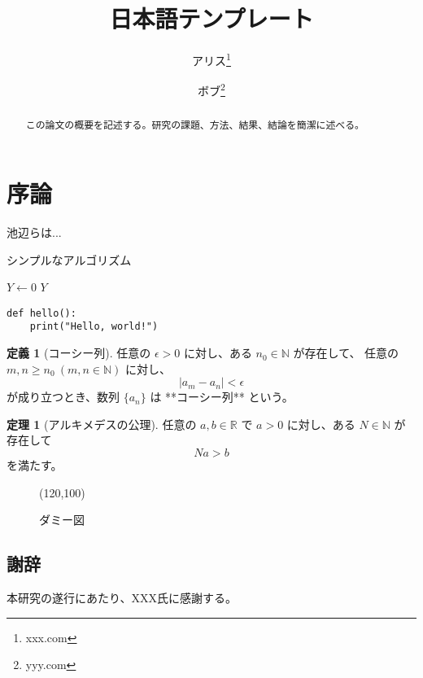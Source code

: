 \documentclass[12pt,dvipdfmx]{jlreq} %
\title{日本語テンプレート}
\author[1]{アリス\thanks{xxx.com}}
\author[1,2]{ボブ\thanks{yyy.com}}
\affil[1]{XXX大学}
\affil[2]{YYY大学}
\date{\empty}
\theoremstyle{definition}
\theoremstyle{definition}
\newtheorem{dfn}{定義}[section]
\newtheorem{thm}{定理}[section]
\begin{document}
\maketitle

\begin{abstract}
この論文の概要を記述する。研究の課題、方法、結果、結論を簡潔に述べる。
\end{abstract}

\section*{序論}
池辺らは...\cite{Ikebe2016-sg}

\begin{algorithm}
\caption{シンプルなアルゴリズム}
$Y \gets 0$\;
\Return $Y$\;
\end{algorithm}


\begin{verbatim}
def hello():
    print("Hello, world!")
\end{verbatim}

\begin{dfn}[コーシー列]
任意の $\epsilon > 0$ に対し、ある $n_0 \in \mathbb{N}$ が存在して、
任意の $m, n \geq n_0 \ (m,n \in \mathbb{N})$ に対し、
\[
\lvert a_m  - a_n  \rvert < \epsilon
\]
が成り立つとき、数列 $\{a_n\}$ は **コーシー列** という。
\end{dfn}	

\begin{thm}[アルキメデスの公理]
任意の $a, b \in \mathbb{R}$ で $a > 0$ に対し、ある $N \in \mathbb{N}$ が存在して
\[
Na > b
\]
を満たす。
\end{thm}

\begin{figure}[htbp]
    \centering
    \framebox(120,100){} 
    \caption{ダミー図}
    \label{fig:dummy}
\end{figure}

\subsection*{謝辞}
本研究の遂行にあたり、XXX氏に感謝する。

\end{document}

